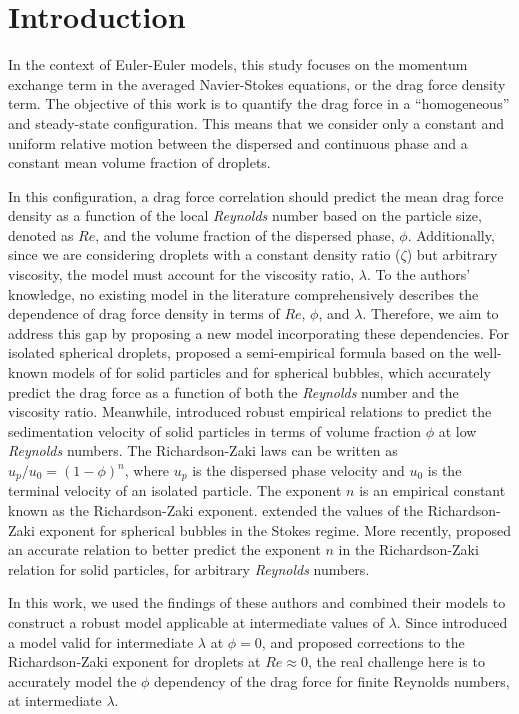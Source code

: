 \section{Introduction}

In the context of Euler-Euler models, this study focuses on the momentum exchange term in the averaged Navier-Stokes equations, or the drag force density term. 
The objective of this work is to quantify the drag force in a ``homogeneous'' and steady-state configuration.
This means that we consider only a constant and uniform relative motion between the dispersed and continuous phase and a constant mean volume fraction of droplets. 

In this configuration, a drag force correlation should predict the mean drag force density as a function of the local \textit{Reynolds} number based on the particle size, denoted as $Re$, and the volume fraction of the dispersed phase, $\phi$. Additionally, since we are considering droplets with a constant density ratio ($\zeta$) but arbitrary viscosity, the model must account for the viscosity ratio, $\lambda$. 
To the authors' knowledge, no existing model in the literature comprehensively describes the dependence of drag force density in terms of $Re$, $\phi$, and $\lambda$. 
Therefore, we aim to address this gap by proposing a new model incorporating these dependencies.
For isolated spherical droplets, \citet{magnaudet1997forces} proposed a semi-empirical formula based on the well-known models of \citet{schiller1933} for solid particles and \citet{mei1994} for spherical bubbles, which accurately predict the drag force as a function of both the \textit{Reynolds} number and the viscosity ratio.
Meanwhile, \citet{richardson1954} introduced robust empirical relations to predict the sedimentation velocity of solid particles in terms of volume fraction $\phi$ at low \textit{Reynolds} numbers. 
The Richardson-Zaki laws can be written as $u_p/u_0 = (1-\phi)^n$, where $u_p$ is the dispersed phase velocity and $u_0$ is the terminal velocity of an isolated particle. 
The exponent $n$ is an empirical constant known as the Richardson-Zaki exponent. 
\citet{ishii1979drag} extended the values of the Richardson-Zaki exponent for spherical bubbles in the Stokes regime. 
More recently, \citet{kramer2019improvement} proposed an accurate relation to better predict the exponent $n$ in the Richardson-Zaki relation for solid particles, for arbitrary \textit{Reynolds} numbers. 

In this work, we used the findings of these authors and combined their models to construct a robust model applicable at intermediate values of $\lambda$.
Since \citet{magnaudet1997forces} introduced a model valid for intermediate $\lambda$ at $\phi = 0$, and \citet{ishii1979drag} proposed corrections to the Richardson-Zaki exponent for droplets at $Re \approx 0$, the real challenge here is to accurately model the $\phi$ dependency of the drag force for finite Reynolds numbers, at intermediate $\lambda$.

